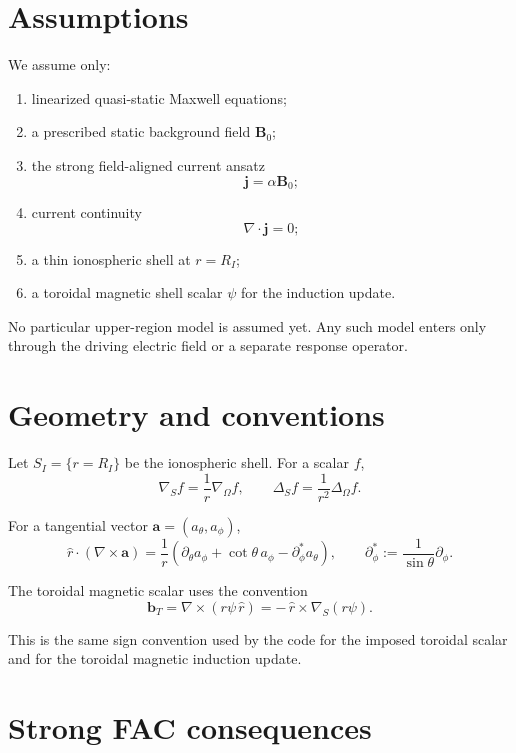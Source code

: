 \documentclass[11pt,a4paper]{article}
\begin{document}
\section{Assumptions}

We assume only:
\begin{enumerate}
\item linearized quasi-static Maxwell equations;
\item a prescribed static background field $\mathbf B_0$;
\item the strong field-aligned current ansatz
\[
\mathbf j = \alpha \mathbf B_0;
\]
\item current continuity
\[
\nabla\cdot \mathbf j = 0;
\]
\item a thin ionospheric shell at $r=R_I$;
\item a toroidal magnetic shell scalar $\psi$ for the induction update.
\end{enumerate}

No particular upper-region model is assumed yet. Any such model enters only
through the driving electric field or a separate response operator.

\section{Geometry and conventions}

Let $S_I=\{r=R_I\}$ be the ionospheric shell. For a scalar $f$,
\[
\nabla_S f = \frac{1}{r}\nabla_\Omega f,
\qquad
\Delta_S f = \frac{1}{r^2}\Delta_\Omega f.
\]

For a tangential vector $\mathbf a=(a_\theta,a_\phi)$,
\[
\hat r\cdot (\nabla\times \mathbf a)
=
\frac{1}{r}
\left(
\partial_\theta a_\phi + \cot\theta\,a_\phi - \partial_\phi^\ast a_\theta
\right),
\qquad
\partial_\phi^\ast := \frac{1}{\sin\theta}\partial_\phi.
\]

The toroidal magnetic scalar uses the convention
\begin{equation}
\mathbf b_T = \nabla\times (r\psi\,\hat r)
=
-\,\hat r\times \nabla_S(r\psi).
\label{eq:b_tor}
\end{equation}

This is the same sign convention used by the code for the imposed toroidal
scalar and for the toroidal magnetic induction update.

\section{Strong FAC consequences}
\end{document}
